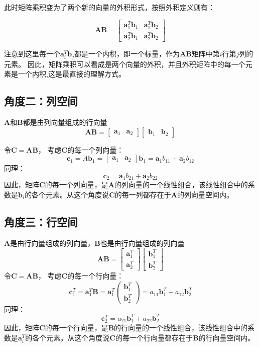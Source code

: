 此时矩阵乘积变为了两个新的向量的外积形式，按照外积定义则有：

$$\bm{A} \bm{B}=\left[\begin{array}{ll}\bm{a}_{1}^{T} \bm{b}_{1} & \bm{a}_{1}^{T} \bm{b}_{2} \\ \bm{a}_{2}^{T} \bm{b}_{1} & \bm{a}_{2}^{T} \bm{b}_{2}\end{array}\right]$$

注意到这里每一个$\bm{a}_{i}^{T} \bm{b}_{j}$都是一个内积，即一个标量，作为$\bm{AB}$矩阵中第$i$行第$j$列的元素。
因此，矩阵乘积可以看成是两个向量的外积，并且外积矩阵中的每一个元素是一个内积,这是最直接的理解方式。

\subsection{角度二：列空间}
$\bm{A}$和$\bm{B}$都是由列向量组成的行向量
$$\bm{A B}=\left[\begin{array}{ll}\bm{a}_{1} & \bm{a}_{2}\end{array}\right]\left[\begin{array}{ll}\bm{b}_{1} & \bm{b}_{2}\end{array}\right]$$

令$\bm{C = AB}$， 考虑$\bm{C}$的每一个列向量：
$$\bm{c}_{1}=A \bm{b}_{1}=\left[\begin{array}{cc}\bm{a}_{1} & \bm{a}_{2}\end{array}\right] \bm{b}_{1}=\bm{a}_{1} {b}_{11}+\bm{a}_{2} {b}_{12}$$
同理：
$$\bm{c}_{2}=\bm{a}_{1} b_{21}+\bm{a}_{2} b_{22}$$
因此，矩阵$\bm{C}$的每一个列向量，是$\bm{A}$的列向量的一个线性组合，该线性组合中的系数是$\bm{b}_i$的各个元素。从这个角度说$\bm{C}$的每一列都存在于$\bm{A}$的列向量空间内。

\subsection{角度三：行空间}
$\bm{A}$是由行向量组成的列向量，$\bm{B}$也是由行向量组成的列向量
$$\bm{A B}=\left[\begin{array}{l}
\bm{a}_{1}^{T} \\
\bm{a}_{2}^{T}
\end{array}\right]\left[\begin{array}{l}
\bm{b}_{1}^{T} \\
\bm{b}_{2}^{T}
\end{array}\right]$$
令$\bm{C = AB}$， 考虑$\bm{C}$的每一个行向量：
$$\bm{c}_{1}^{T}=\bm{a}_{1}^{T} \bm{B}=\bm{a}_{1}^{T}\left(\begin{array}{l}\bm{b}_{1}^{T} \\ \bm{b}_{2}^{T}\end{array}\right)={a}_{11} \bm{b}_{1}^{T}+{a}_{12} \bm{b}_{2}^{T}$$
同理：
$$\bm{c}_{2}^{T}=a_{21} \bm{b}_{1}^{T} + a_{22} \bm{b}_{2}^{T}$$
因此，矩阵$\bm{C}$的每一个行向量，是$\bm{B}$的行向量的一个线性组合，该线性组合中的系数是$\bm{a}^{T}_{i}$的各个元素。从这个角度说$\bm{C}$的每一个行向量都存在于$\bm{B}$的行向量空间内。


